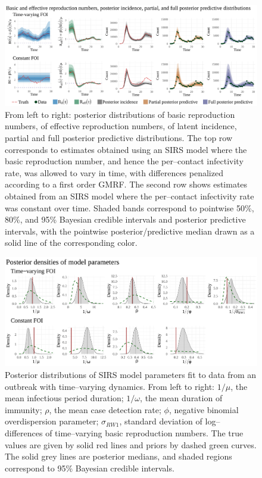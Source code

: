 \begin{figure}[htbp]
	\centering
	\includegraphics[width=\linewidth]{figures/sinfoi_lna_tparam_plots}
	\caption[Time--varying reproduction numbers, latent incidence, and posterior predictive distributions for SIRS models fit to data from an outbreak with time--varying dynamics.]{From left to right: posterior distributions of basic reproduction numbers, of effective reproduction numbers, of latent incidence, partial and full posterior predictive distributions. The top row corresponds to estimates obtained using an SIRS model where the basic reproduction number, and hence the per--contact infectivity rate, was allowed to vary in time, with differences penalized according to a first order GMRF. The second row shows estimates obtained from an SIRS model where the per--contact infectivity rate was constant over time. Shaded bands correspond to pointwise 50\%, 80\%, and 95\% Bayesian credible intervals and posterior predictive intervals, with the pointwise posterior/predictive median drawn as a solid line of the corresponding color.}
	\label{fig:sinfoi_tparam_plots}
\end{figure}

\begin{figure}[htbp]
	\centering
	\includegraphics[width=\linewidth]{figures/sinfoi_lna_param_plots}
	\caption[Posterior distributions of SIRS model parameters fit to data from an outbreak with time--varying dynamics.]{Posterior distributions of SIRS model parameters fit to data from an outbreak with time--varying dynamics. From left to right: $ 1/\mu $, the mean infectious period duration; $ 1/\omega $, the mean duration of immunity; $ \rho $, the mean case detection rate; $ \phi $, negative binomial overdispersion parameter; $ \sigma_{RW1} $, standard deviation of log--differences of time--varying basic reproduction numbers. The true values are given by solid red lines and priors by dashed green curves. The solid grey lines are posterior medians, and shaded regions correspond to 95\% Bayesian credible intervals.}
	\label{fig:sinfoi_param_plots}
\end{figure}

